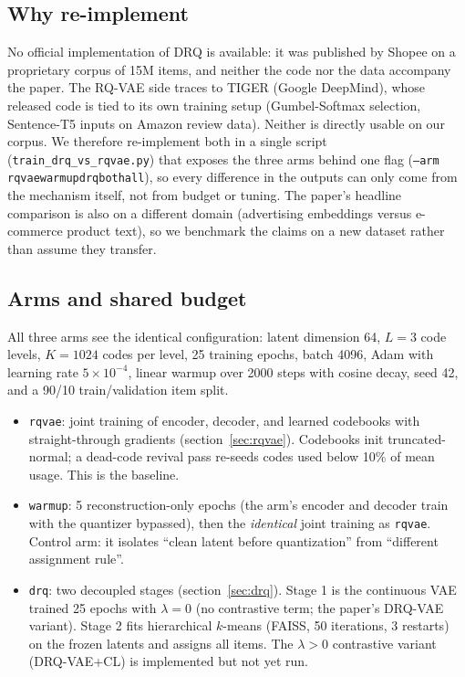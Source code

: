 \documentclass[11pt]{article}
\begin{document}
\subsection{Why re-implement}

No official implementation of DRQ is available: it was published by Shopee on a
proprietary corpus of 15M items, and neither the code nor the data accompany the
paper. The RQ-VAE side traces to TIGER (Google DeepMind), whose released code is
tied to its own training setup (Gumbel-Softmax selection, Sentence-T5 inputs on
Amazon review data). Neither is directly usable on our corpus. We therefore
re-implement both in a single script (\texttt{train\_drq\_vs\_rqvae.py}) that
exposes the three arms behind one flag (\texttt{--arm
rqvae\textbar warmup\textbar drq\textbar both\textbar all}), so every
difference in the outputs can only come from the mechanism itself, not from
budget or tuning. The paper's headline comparison is also on a different domain
(advertising embeddings versus e-commerce product text), so we benchmark the
claims on a new dataset rather than assume they transfer.

\subsection{Arms and shared budget}

All three arms see the identical configuration: latent dimension 64, $L = 3$
code levels, $K = 1024$ codes per level, 25 training epochs, batch 4096, Adam
with learning rate $5 \times 10^{-4}$, linear warmup over 2000 steps with cosine
decay, seed 42, and a 90/10 train/validation item split.

\begin{itemize}[nosep]
  \item \texttt{rqvae}: joint training of encoder, decoder, and learned
  codebooks with straight-through gradients (section~\ref{sec:rqvae}).
  Codebooks init truncated-normal; a dead-code revival pass re-seeds codes used
  below 10\% of mean usage. This is the baseline.
  \item \texttt{warmup}: 5 reconstruction-only epochs (the arm's encoder and
  decoder train with the quantizer bypassed), then the \emph{identical} joint
  training as \texttt{rqvae}. Control arm: it isolates ``clean latent before
  quantization'' from ``different assignment rule''.
  \item \texttt{drq}: two decoupled stages (section~\ref{sec:drq}). Stage 1 is
  the continuous VAE trained 25 epochs with $\lambda = 0$ (no contrastive term;
  the paper's DRQ-VAE variant). Stage 2 fits hierarchical $k$-means (FAISS, 50
  iterations, 3 restarts) on the frozen latents and assigns all items. The
  $\lambda > 0$ contrastive variant (DRQ-VAE+CL) is implemented but not yet run.
\end{itemize}
\end{document}
